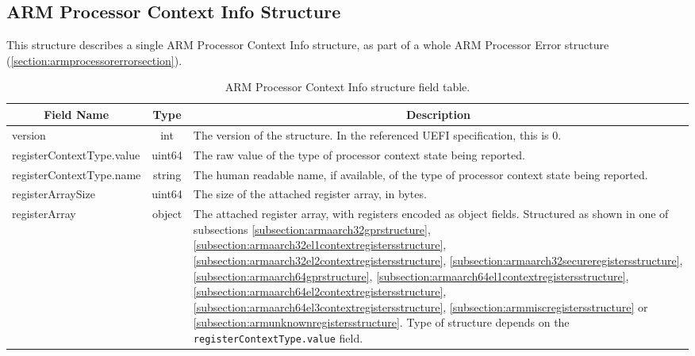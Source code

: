 \documentclass{report}
\newcommand*{\thead}[1]{\multicolumn{1}{|c|}{\bfseries #1}}
\newcommand*{\jsontable}[1]{
    \begin{table}[!ht]
    \label{#1}
    \centering
    \begin{adjustbox}{center}
    \begin{tabular}{|l|c|p{8cm}|}
    \hline
    \thead{Field Name} & \thead{Type} & \thead{Description} \\
    \hline
}
\newcommand*{\jsontableend}[1]{
    \hline
    \end{tabular}
    \end{adjustbox}
    \caption{#1}
    \label{table:#1}
    \end{table}
    \FloatBarrier
}
\begin{document}
\subsection{ARM Processor Context Info Structure}
\label{subsection:armprocessorcontextinfostructure}
This structure describes a single ARM Processor Context Info structure, as part of a whole ARM Processor Error structure (\ref{section:armprocessorerrorsection}).
\jsontable{table:armprocessorcontextinfostructure}
version & int & The version of the structure. In the referenced UEFI specification, this is 0.\\
\hline
registerContextType.value & uint64 & The raw value of the type of processor context state being reported.\\
registerContextType.name & string & The human readable name, if available, of the type of processor context state being reported.\\
\hline
registerArraySize & uint64 & The size of the attached register array, in bytes.\\
\hline
registerArray & object & The attached register array, with registers encoded as object fields. Structured as shown in one of subsections \ref{subsection:armaarch32gprstructure}, \ref{subsection:armaarch32el1contextregistersstructure}, \ref{subsection:armaarch32el2contextregistersstructure}, \ref{subsection:armaarch32secureregistersstructure}, \ref{subsection:armaarch64gprstructure}, \ref{subsection:armaarch64el1contextregistersstructure}, \ref{subsection:armaarch64el2contextregistersstructure}, \ref{subsection:armaarch64el3contextregistersstructure}, \ref{subsection:armmiscregistersstructure} or \ref{subsection:armunknownregistersstructure}. Type of structure depends on the \texttt{registerContextType.value} field.\\
\jsontableend{ARM Processor Context Info structure field table.}

\end{document}
